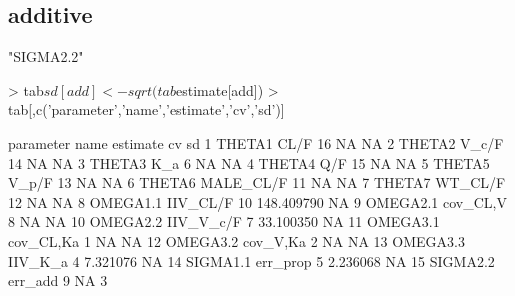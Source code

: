 \subsection{additive}
\begin{Schunk}
\begin{Soutput}
[1] "SIGMA2.2"
\end{Soutput}
\begin{Sinput}
> tab$sd[add] <- sqrt(tab$estimate[add])
> tab[,c('parameter','name','estimate','cv','sd')]
\end{Sinput}
\begin{Soutput}
   parameter      name estimate         cv sd
1     THETA1      CL/F       16         NA NA
2     THETA2     V_c/F       14         NA NA
3     THETA3       K_a        6         NA NA
4     THETA4       Q/F       15         NA NA
5     THETA5     V_p/F       13         NA NA
6     THETA6 MALE_CL/F       11         NA NA
7     THETA7   WT_CL/F       12         NA NA
8   OMEGA1.1  IIV_CL/F       10 148.409790 NA
9   OMEGA2.1  cov_CL,V        8         NA NA
10  OMEGA2.2 IIV_V_c/F        7  33.100350 NA
11  OMEGA3.1 cov_CL,Ka        1         NA NA
12  OMEGA3.2  cov_V,Ka        2         NA NA
13  OMEGA3.3   IIV_K_a        4   7.321076 NA
14  SIGMA1.1  err_prop        5   2.236068 NA
15  SIGMA2.2   err_add        9         NA  3
\end{Soutput}
\end{Schunk}
